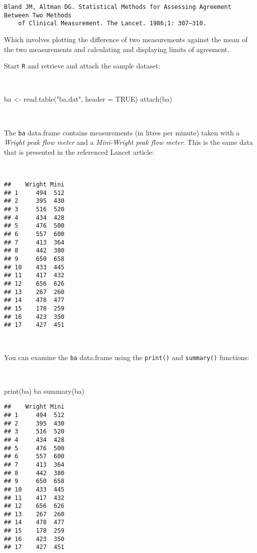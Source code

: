 \documentclass[
  12pt,
  a4paper]{book}
\newenvironment{Shaded}{\begin{snugshade}}{\end{snugshade}}
\newcommand{\AttributeTok}[1]{\textcolor[rgb]{0.77,0.63,0.00}{#1}}
\newcommand{\ConstantTok}[1]{\textcolor[rgb]{0.00,0.00,0.00}{#1}}
\newcommand{\FunctionTok}[1]{\textcolor[rgb]{0.00,0.00,0.00}{#1}}
\newcommand{\NormalTok}[1]{#1}
\newcommand{\OtherTok}[1]{\textcolor[rgb]{0.56,0.35,0.01}{#1}}
\newcommand{\StringTok}[1]{\textcolor[rgb]{0.31,0.60,0.02}{#1}}
\begin{document}
\begin{verbatim}
Bland JM, Altman DG. Statistical Methods for Assessing Agreement Between Two Methods 
    of Clinical Measurement. The Lancet. 1986;1: 307–310. 
\end{verbatim}

Which involves plotting the difference of two measurements against the mean of the two measurements and calculating and displaying limits of agreement.

Start \texttt{R} and retrieve and attach the sample dataset:

~

\begin{Shaded}
\begin{Highlighting}[]
\NormalTok{ba }\OtherTok{\textless{}{-}} \FunctionTok{read.table}\NormalTok{(}\StringTok{"ba.dat"}\NormalTok{, }\AttributeTok{header =} \ConstantTok{TRUE}\NormalTok{)}
\FunctionTok{attach}\NormalTok{(ba)}
\end{Highlighting}
\end{Shaded}

~

The \texttt{ba} data.frame contains measurements (in litres per minute) taken with a \emph{Wright peak flow meter} and a \emph{Mini-Wright peak flow meter}. This is the same data that is presented in the referenced Lancet article:

~

\begin{verbatim}
##    Wright Mini
## 1     494  512
## 2     395  430
## 3     516  520
## 4     434  428
## 5     476  500
## 6     557  600
## 7     413  364
## 8     442  380
## 9     650  658
## 10    433  445
## 11    417  432
## 12    656  626
## 13    267  260
## 14    478  477
## 15    178  259
## 16    423  350
## 17    427  451
\end{verbatim}

~

You can examine the \texttt{ba} data.frame using the \texttt{print()} and \texttt{summary()} functions:

~

\begin{Shaded}
\begin{Highlighting}[]
\FunctionTok{print}\NormalTok{(ba)}
\NormalTok{ba}
\FunctionTok{summary}\NormalTok{(ba)}
\end{Highlighting}
\end{Shaded}

\begin{verbatim}
##    Wright Mini
## 1     494  512
## 2     395  430
## 3     516  520
## 4     434  428
## 5     476  500
## 6     557  600
## 7     413  364
## 8     442  380
## 9     650  658
## 10    433  445
## 11    417  432
## 12    656  626
## 13    267  260
## 14    478  477
## 15    178  259
## 16    423  350
## 17    427  451
\end{verbatim}
\end{document}
